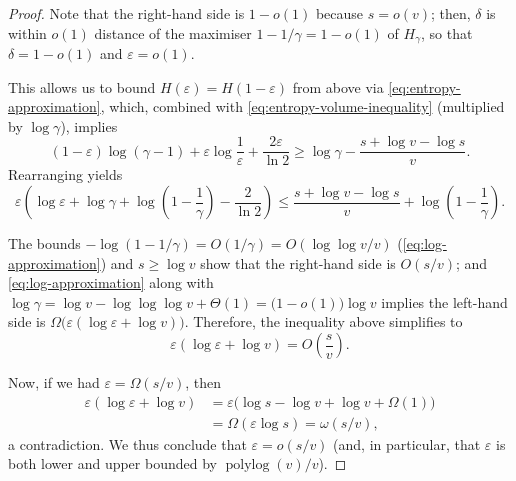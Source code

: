 \documentclass[a4paper,UKenglish,cleveref, autoref, thm-restate]{lipics-v2021}
\theoremstyle{definition}
\newcommand{\polylog}{\operatorname{polylog}}
\newcommand{\eps}{\varepsilon}
\newcommand{\vcommitlength}{v}
\newcommand{\alphabetsize}{\gamma}
\begin{document}
\begin{proof}
    Note that the right-hand side is $1 - o(1)$ because $s = o(\vcommitlength)$; then, $\delta$ is within $o(1)$ distance of the maximiser $1 - 1/\alphabetsize = 1 - o(1)$ of $H_\alphabetsize$, so that $\delta = 1 - o(1)$ and $\eps = o(1)$.
    
    This allows us to bound $H(\eps) = H(1 - \eps)$ from above via \cref{eq:entropy-approximation}, which, combined with \cref{eq:entropy-volume-inequality} (multiplied by $\log \alphabetsize$), implies
    \begin{equation*}
        (1 - \eps) \log(\alphabetsize - 1) + \eps \log \frac1{\eps} + \frac{2 \eps}{\ln 2} \geq \log \alphabetsize - \frac{s + \log \vcommitlength - \log s}{\vcommitlength}.
    \end{equation*}
    Rearranging yields
    \begin{equation*}
        \eps \left(\log \eps + \log \alphabetsize + \log \left(1 - \frac1{\alphabetsize}\right) - \frac{2}{\ln 2}\right) \leq  \frac{s + \log \vcommitlength - \log s}{\vcommitlength} + \log \left(1 - \frac1{\alphabetsize}\right).
    \end{equation*}

    The bounds $-\log(1-1/\alphabetsize) = O(1/\alphabetsize) = O(\log\log \vcommitlength / \vcommitlength)$ (\cref{eq:log-approximation}) and $s \geq \log \vcommitlength$ show that the right-hand side is $O(s/\vcommitlength)$; and \cref{eq:log-approximation} along with $\log \alphabetsize = \log \vcommitlength - \log\log\log \vcommitlength + \Theta(1) = \big(1 - o(1)\big)\log \vcommitlength$ implies the left-hand side is $\Omega\big(\eps (\log \eps + \log \vcommitlength)\big)$. Therefore, the inequality above simplifies to
    \begin{equation*}
        \eps (\log \eps + \log \vcommitlength) = O\left(\frac{s}{\vcommitlength}\right).
    \end{equation*}

    Now, if we had $\eps = \Omega(s/\vcommitlength)$, then
    \begin{align*}
        \eps (\log \eps + \log \vcommitlength) &= \eps \big(\log s - \log \vcommitlength + \log \vcommitlength + \Omega(1)\big)\\
        &= \Omega(\eps \log s) = \omega(s/\vcommitlength),
    \end{align*}
    a contradiction. We thus conclude that $\eps = o(s/\vcommitlength)$ (and, in particular, that $\eps$ is both lower and upper bounded by $\polylog(\vcommitlength)/\vcommitlength$).


\end{proof}
\end{document}
